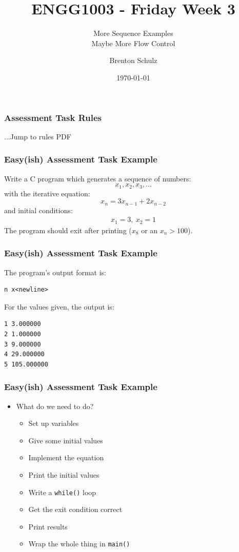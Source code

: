 \documentclass[14pt]{beamer}
\title{ENGG1003 - Friday Week 3}
\subtitle{More Sequence Examples\\Maybe More Flow Control}
\author{Brenton Schulz}
\institute{University of Newcastle}
\date{\today}
\begin{document}
\titlepage


\begin{frame}
\frametitle{Assessment Task Rules}
\begin{center}
...Jump to rules PDF
\end{center}
\end{frame}

\begin{frame}
\frametitle{Easy(ish) Assessment Task Example}
{\small Write a C program which generates a sequence of numbers:
\begin{equation*}
x_1, x_2, x_3, ...
\end{equation*}
with the iterative equation:
\begin{equation*}
x_n = 3x_{n-1} + 2x_{n-2}
\end{equation*}
and initial conditions:
\begin{align*}
x_1 = 3,~ x_2 = 1
\end{align*}
The program should exit after printing ($x_8$ or an $x_n > 100$).
}
\end{frame}

\begin{frame}[fragile]
\frametitle{Easy(ish) Assessment Task Example}
The program's output format is:
\begin{lstlisting}[style=pseudo]
n x<newline>
\end{lstlisting}
For the values given, the output is:
\begin{lstlisting}[style=pseudo]
1 3.000000
2 1.000000
3 9.000000
4 29.000000
5 105.000000
\end{lstlisting}
\end{frame}

\begin{frame}
\frametitle{Easy(ish) Assessment Task Example}
\begin{itemize}
\item What do we need to do?
	\begin{itemize}
		\item Set up variables
		\item Give some initial values
		\item Implement the equation
		\item Print the initial values
		\item Write a \texttt{while()} loop
		\item Get the exit condition correct
		\item Print results
		\item Wrap the whole thing in \texttt{main()}
	\end{itemize}
\end{itemize}
\end{frame}
\end{document}
